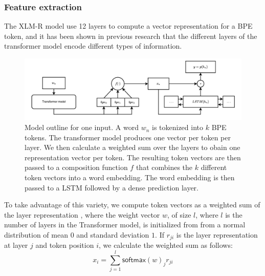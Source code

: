 \documentclass[11pt]{article}
\newcommand\adam[1]{(\textbf{Adam:} #1)}
\newcommand\citep{\cite}
\newcommand\softmax{\mathsf{softmax}}
\begin{document}
	\subsubsection{Feature extraction}
        \label{sec:bpe-features}

         The XLM-R model use 12 layers to compute a vector
     representation for a BPE token, and it has been shown in previous
     research
     \citep{kondratyukstraka,raganato2018analysis,liu2019linguistic}
     that the different layers of the transformer model encode
     different types of information.


    \begin{figure}%
    \centering
	\includegraphics[scale=0.5]{single-step-final.pdf}
        \caption{\label{fig:model} Model outline for one input. A word
     $w_n$ is tokenized into $k$ BPE tokens. The transformer model produces one vector per token per layer.
     We then calculate a weighted sum over the layers to obain one representation vector per token.
     The resulting token vectors are then passed to a
     composition function $f$ that combines the $k$ different
     token vectors into a word embedding. The word embedding is then
     passed to a LSTM followed by a dense prediction layer. }
	\end{figure}

                    To take advantage of this variety, we compute token
     vectors as a weighted sum of the layer representation
     \citep{kondratyukstraka}, where the weight vector $w$, of size
     $l$, where $l$ is the number of layers in the Transformer model,
     is initialized from from a normal distribution of mean $0$ and
     standard deviation $1$. If $r_{ji}$ is the layer representation
     at layer $j$ and token position $i$, we calculate the weighted
     sum as follows:
    \begin{equation}
		x_i = \sum_{j=1}^{l} \softmax(w)_j r_{ji}
	\end{equation}
\end{document}
